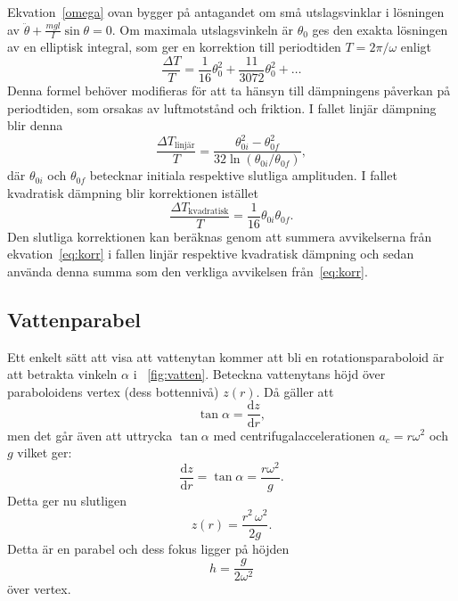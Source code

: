 \documentclass[11pt,a4paper]{article}
\newcommand{\rd}{\ensuremath{\mathrm{d}}}
\newcommand{\figref}{\figurename~\ref}
\begin{document}
Ekvation~\eqref{omega} ovan bygger på antagandet om små utslagsvinklar i lösningen av $\ddot\theta + \frac{mgl}{I}\sin\theta=0$. Om maximala utslagsvinkeln är $\theta_0$ ges den exakta lösningen av en elliptisk integral, som ger en korrektion till periodtiden $T=2\pi/\omega$ enligt \cite{planpendel1986}
\begin{equation} \label{eq:korr}
\frac{\Delta T}{T} = \frac{1}{16}\theta_0^2 + \frac{11}{3072}\theta_0^2 + \dots
\end{equation}
Denna formel behöver modifieras för att ta hänsyn till dämpningens påverkan på periodtiden, som orsakas av luftmotstånd och friktion. I fallet linjär dämpning blir denna
\[ \frac{\Delta T_\text{linjär}}{T} = \frac{\theta_{0i}^2 - \theta_{0f}^2}{32\ln(\theta_{0i}/\theta_{0f})}, \]
där $\theta_{0i}$ och $\theta_{0f}$ betecknar initiala respektive slutliga amplituden. I fallet kvadratisk dämpning blir korrektionen istället
\[ \frac{\Delta T_\mathrm{kvadratisk}}{T} = \frac{1}{16}\theta_{0i}\theta_{0f}. \]
Den slutliga korrektionen kan beräknas genom att summera avvikelserna från ekvation~\eqref{eq:korr} i fallen linjär respektive kvadratisk dämpning och sedan använda denna summa som den verkliga avvikelsen från~\eqref{eq:korr}.\cite{planpendel1986}







\subsection{Vattenparabel}\label{sec:vattenparabel_teori}

Ett enkelt sätt att visa att vattenytan kommer att bli en rotationsparaboloid är att betrakta vinkeln $\alpha$ i \figref{fig:vatten}. Beteckna vattenytans höjd över paraboloidens vertex (dess bottennivå) $z(r)$. Då gäller att 
\begin{equation*}
\tan\alpha = \frac{\rd z}{\rd r},
\end{equation*}
men det går även att uttrycka $\tan\alpha$ med centrifugalaccelerationen $a_c=r\omega^2$ och $g$ vilket ger:
\begin{equation}\label{eq:lutning}
\frac{\rd z}{\rd r}%
=\tan\alpha =\frac{r\omega^2}{g}.
\end{equation}
Detta ger nu slutligen
\begin{equation*}
z(r)
=\frac{r^2\,\omega^2}{2g}.
\end{equation*}
Detta är en parabel och dess fokus ligger på höjden\cite{Physics_Handbook}
\[ h=\frac{g}{2\omega^2} \]
över vertex.
\end{document}
